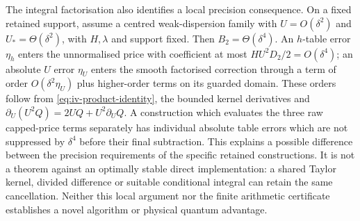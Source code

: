 The integral factorisation also identifies a local precision consequence.
On a fixed retained support, assume a centred weak-dispersion family with
$U=O(\delta^2)$ and $U_*=\Theta(\delta^2)$, with $H,\lambda$ and support
fixed.  Then $B_2=\Theta(\delta^4)$.  An $h$-table error $\eta_h$ enters
the unnormalised price with coefficient at most
$HU^2D_2/2=O(\delta^4)$; an absolute $U$ error $\eta_U$ enters the smooth
factorised correction through a term of order $O(\delta^2\eta_U)$ plus
higher-order terms on its guarded domain.  These orders follow from
\eqref{eq:iv-product-identity}, the bounded kernel derivatives and
$\partial_U(U^2Q)=2UQ+U^2\partial_UQ$.
A construction which evaluates the three raw capped-price terms separately
has individual absolute table errors which are not suppressed by $\delta^4$
before their final subtraction.  This explains a possible difference between
the precision requirements of the specific retained constructions.  It is
not a theorem against an optimally stable direct implementation: a shared
Taylor kernel, divided difference or suitable conditional integral can retain
the same cancellation.  Neither this local argument nor the finite arithmetic
certificate establishes a novel algorithm or physical quantum advantage.
